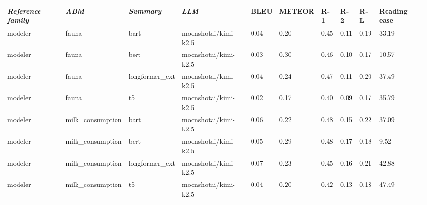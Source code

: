 \begin{tabular}{|l|l|l|l|l|l|l|l|l|l|}
\hline
\textit{\textbf{Reference family}} & \textit{\textbf{ABM}} & \textit{\textbf{Summary}} & \textit{\textbf{LLM}} & BLEU & METEOR & R-1 & R-2 & R-L & Reading ease \\
 \hline
 modeler & fauna & bart & moonshotai/kimi-k2.5 & 0.04 & 0.20 & 0.45 & 0.11 & 0.19 & 33.19 \\
 \hline
 modeler & fauna & bert & moonshotai/kimi-k2.5 & 0.03 & 0.30 & 0.46 & 0.10 & 0.17 & 10.57 \\
 \hline
 modeler & fauna & longformer\_ext & moonshotai/kimi-k2.5 & 0.04 & 0.24 & 0.47 & 0.11 & 0.20 & 37.49 \\
 \hline
 modeler & fauna & t5 & moonshotai/kimi-k2.5 & 0.02 & 0.17 & 0.40 & 0.09 & 0.17 & 35.79 \\
 \hline
 modeler & milk\_consumption & bart & moonshotai/kimi-k2.5 & 0.06 & 0.22 & 0.48 & 0.15 & 0.22 & 37.09 \\
 \hline
 modeler & milk\_consumption & bert & moonshotai/kimi-k2.5 & 0.05 & 0.29 & 0.48 & 0.17 & 0.18 & 9.52 \\
 \hline
 modeler & milk\_consumption & longformer\_ext & moonshotai/kimi-k2.5 & 0.07 & 0.23 & 0.45 & 0.16 & 0.21 & 42.88 \\
 \hline
 modeler & milk\_consumption & t5 & moonshotai/kimi-k2.5 & 0.04 & 0.20 & 0.42 & 0.13 & 0.18 & 47.49 \\
\hline
\end{tabular}
